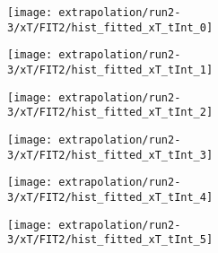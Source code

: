 \begin{figure}
\centering
\caption{Fit to the flask subtracted yield ratio with FIT2 for $x_T$ for run 2-3.}
\label{fig:run2-3_FIT2_xT}
\begin{subfigure}{0.45\linewidth}
\texttt{[image: extrapolation/run2-3/xT/FIT2/hist\_fitted\_xT\_tInt\_0]}
\end{subfigure}
\begin{subfigure}{0.45\linewidth}
\texttt{[image: extrapolation/run2-3/xT/FIT2/hist\_fitted\_xT\_tInt\_1]}
\end{subfigure}
\begin{subfigure}{0.45\linewidth}
\texttt{[image: extrapolation/run2-3/xT/FIT2/hist\_fitted\_xT\_tInt\_2]}
\end{subfigure}
\begin{subfigure}{0.45\linewidth}
\texttt{[image: extrapolation/run2-3/xT/FIT2/hist\_fitted\_xT\_tInt\_3]}
\end{subfigure}
\begin{subfigure}{0.45\linewidth}
\texttt{[image: extrapolation/run2-3/xT/FIT2/hist\_fitted\_xT\_tInt\_4]}
\end{subfigure}
\begin{subfigure}{0.45\linewidth}
\texttt{[image: extrapolation/run2-3/xT/FIT2/hist\_fitted\_xT\_tInt\_5]}
\end{subfigure}
\end{figure}
